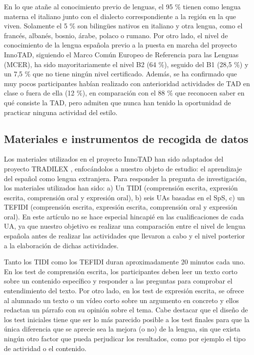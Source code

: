 \documentclass[spanish]{textolivre}
\begin{document}
En lo que atañe al conocimiento previo de lenguas, el 95 \% tienen como lengua materna el italiano junto con el dialecto correspondiente a la región en la que viven. Solamente el 5 \% son bilingües nativos en italiano y otra lengua, como el francés, albanés, bosnio, árabe, polaco o rumano. Por otro lado, el nivel de conocimiento de la lengua española previo a la puesta en marcha del proyecto InnoTAD, siguiendo el Marco Común Europeo de Referencia para las Lenguas (MCER), ha sido mayoritariamente el nivel B2 (64 \%), seguido del B1 (28,5 \%) y un 7,5 \% que no tiene ningún nivel certificado. Además, se ha confirmado que muy pocos participantes habían realizado con anterioridad actividades de TAD en clase o fuera de ella (12 \%), en comparación con el 88 \% que reconocen saber en qué consiste la TAD, pero admiten que nunca han tenido la oportunidad de practicar ninguna actividad del estilo.

\subsection{Materiales e instrumentos de recogida de datos}
Los materiales utilizados en el proyecto InnoTAD han sido adaptados del proyecto TRADILEX \cite{couto-cantero2021}, enfocándolos a nuestro objeto de estudio: el aprendizaje del español como lengua extranjera. Para responder la pregunta de investigación, los materiales utilizados han sido: a) Un TIDI (comprensión escrita, expresión escrita, comprensión oral y expresión oral), b) seis UAs basadas en el SpS, c) un TEFIDI (comprensión escrita, expresión escrita, comprensión oral y expresión oral). En este artículo no se hace especial hincapié en las cualificaciones de cada UA, ya que nuestro objetivo es realizar una comparación entre el nivel de lengua española antes de realizar las actividades que llevaron a cabo y el nivel posterior a la elaboración de dichas actividades.

Tanto los TIDI como los TEFIDI duran aproximadamente 20 minutos cada uno. En los test de comprensión escrita, los participantes deben leer un texto corto sobre un contenido específico y responder a las preguntas para comprobar el entendimiento del texto. Por otro lado, en los test de expresión escrita, se ofrece al alumnado un texto o un vídeo corto sobre un argumento en concreto y ellos redactan un párrafo con su opinión sobre el tema. Cabe destacar que el diseño de los test iniciales tiene que ser lo más parecido posible a los test finales para que la única diferencia que se aprecie sea la mejora (o no) de la lengua, sin que exista ningún otro factor que pueda perjudicar los resultados, como por ejemplo el tipo de actividad o el contenido.
\end{document}
